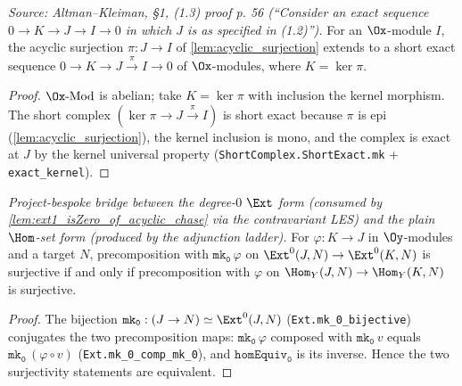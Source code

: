 \begin{lemma}

  \label{lem:acyclic_ses}
  \textit{Source: Altman--Kleiman, §1, (1.3) proof p. 56 (``Consider an exact
  sequence $0 \to K \to J \to I \to 0$ in which $J$ is as specified in (1.2)'').}
  For an $\Ox$-module $I$, the acyclic surjection $\pi : J \to I$ of
  \cref{lem:acyclic_surjection} extends to a short exact sequence
  $0 \to K \to J \xrightarrow{\pi} I \to 0$ of $\Ox$-modules, where $K = \ker\pi$.
  \begin{proof}
    $\Ox\text{-Mod}$ is abelian; take $K = \ker\pi$ with inclusion the kernel
    morphism. The short complex $(\ker\pi \to J \xrightarrow{\pi} I)$ is short exact
    because $\pi$ is epi (\cref{lem:acyclic_surjection}), the kernel inclusion is
    mono, and the complex is exact at $J$ by the kernel universal property
    (\texttt{ShortComplex.ShortExact.mk} + \texttt{exact\_kernel}).
  \end{proof}
\end{lemma}

\begin{lemma}

  \label{lem:ext0_precomp_surjective_iff}
  \textit{Project-bespoke bridge between the degree-$0$ $\Ext$ form (consumed by
  \cref{lem:ext1_isZero_of_acyclic_chase} via the contravariant LES) and the plain
  $\Hom$-set form (produced by the adjunction ladder).}
  For $\varphi : K \to J$ in $\Oy$-modules and a target $N$, precomposition with
  $\mathtt{mk_0}\,\varphi$ on $\Ext^0(J,N) \to \Ext^0(K,N)$ is surjective if and
  only if precomposition with $\varphi$ on $\Hom_Y(J,N) \to \Hom_Y(K,N)$ is
  surjective.
  \begin{proof}
    The bijection $\mathtt{mk_0} : (J \to N) \simeq \Ext^0(J,N)$
    (\texttt{Ext.mk\_0\_bijective}) conjugates the two precomposition maps:
    $\mathtt{mk_0}\,\varphi$ composed with $\mathtt{mk_0}\,v$ equals
    $\mathtt{mk_0}\,(\varphi \circ v)$ (\texttt{Ext.mk\_0\_comp\_mk\_0}), and
    $\mathtt{homEquiv_0}$ is its inverse. Hence the two surjectivity statements are
    equivalent.
  \end{proof}
\end{lemma}

